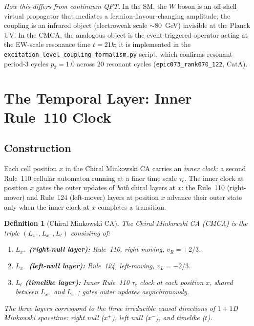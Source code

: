 \documentclass[11pt]{article}
\newtheorem{definition}[theorem]{Definition}
\theoremstyle{remark}
\begin{document}
\noindent\textit{How this differs from continuum QFT.}
In the SM, the $W$ boson is an off-shell virtual propagator that mediates
a fermion-flavour-changing amplitude; the coupling is an infrared object
(electroweak scale $\sim80$~GeV) invisible at the Planck UV.
In the CMCA, the analogous object is the event-triggered operator acting
at the EW-scale resonance time $t=21k$; it is implemented in the
\texttt{excitation\_level\_coupling\_formalism.py} script, which
confirms resonant period-3 cycles $p_3=1.0$ across 20 resonant
cycles (\texttt{epic073\_rank070\_122}, CatA).

\section{The Temporal Layer: Inner Rule~110 Clock}
\label{sec:temporal_layer}

\subsection{Construction}
\label{ssec:temporal_construction}

Each cell position $x$ in the Chiral Minkowski CA carries an \emph{inner clock}:
a second Rule~110 cellular automaton running at a finer time scale $\tau_c$.
The inner clock at position $x$ gates the outer updates of \emph{both} chiral
layers at $x$: the Rule~110 (right-mover) and Rule~124 (left-mover) layers at
position $x$ advance their outer state only when the inner clock at $x$ completes
a transition.

\begin{definition}[Chiral Minkowski CA]
\label{def:cmca}
The \emph{Chiral Minkowski CA} (CMCA) is the triple
$(L_{x^+}, L_{x^-}, L_t)$ consisting of:
\begin{enumerate}[noitemsep]
  \item \textbf{$L_{x^+}$ (right-null layer):} Rule~110, right-moving, $v_R=+2/3$.
  \item \textbf{$L_{x^-}$ (left-null layer):} Rule~124, left-moving, $v_L=-2/3$.
  \item \textbf{$L_t$ (timelike layer):} Inner Rule~110 $\tau_c$ clock at each
    position $x$, shared between $L_{x^+}$ and $L_{x^-}$; gates outer updates
    asynchronously.
\end{enumerate}
The three layers correspond to the three irreducible causal directions of
$1+1$D Minkowski spacetime: right null ($x^+$), left null ($x^-$), and
timelike ($t$).
\end{definition}
\end{document}
